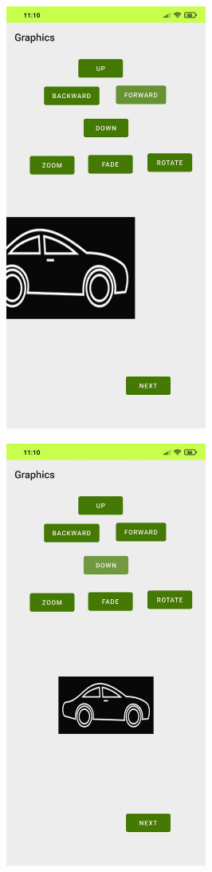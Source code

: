 \documentclass[12pt,letterpaper]{article}
\begin{document}
\begin{figure}
    \centering
    \includegraphics[height=14cm, keepaspectratio]{Outputs/OP5.png}
\end{figure}
\begin{figure}
    \centering
    \includegraphics[height=14cm, keepaspectratio]{Outputs/OP6.png}
\end{figure}
\end{document}
